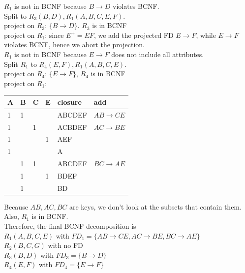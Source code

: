 \documentclass[letter, 9pt]{article}
\begin{document}
\begin{enumerate}
\begin{enumerate}
$R_1$ is not in BCNF because $B\rightarrow D$ violates BCNF. \\
Split to $R_3(B,D), R_1(A,B,C,E,F)$. \\
project on $R_3$: $\{B\rightarrow D\}$. $R_3$ is in BCNF\\
project on $R_1$: since $E^+ = EF$, we add the projected FD $E\rightarrow F$, while $E\rightarrow F$ violates BCNF, hence we abort the projection. \\

$R_1$ is not in BCNF because $E\rightarrow F$ does not include all attributes. \\
Split $R_1$ to $R_{4}(E, F), R_{1}(A, B, C, E)$. \\
project on $R_4$: $\{E\rightarrow F\}$, $R_4$ is in BCNF \\
project on $R_1$: 
\begin{center}
\begin{tabular}{|l|l|l|l|l|l|}
\hline
A & B & C & E & closure & add                \\ \hline
1 & 1 &   &   & ABCDEF  & $AB\rightarrow CE$ \\ \hline
1 &   & 1 &   & ACBDEF  & $AC\rightarrow BE$ \\ \hline
1 &   &   & 1 & AEF     &                    \\ \hline
1 &   &   &   & A       &                    \\ \hline
  & 1 & 1 &   & ABCDEF  & $BC\rightarrow AE$  \\ \hline
  & 1 &   & 1 & BDEF    &                    \\ \hline
  & 1 &   &   & BD      &                    \\ \hline
\end{tabular}
\end{center}
Because $AB,AC,BC$ are keys, we don't look at the subsets that contain them. Also, $R_1$ is in BCNF. \\
Therefore, the final BCNF decomposition is\\
$R_1(A,B,C,E)$ with $FD_1 =\{AB\rightarrow CE, AC\rightarrow BE, BC\rightarrow AE\}$ \\
$R_2(B,C,G)$ with no FD \\
$R_3(B,D)$ with $FD_3=\{B\rightarrow D\}$ \\
$R_4(E,F)$ with $FD_4 = \{E\rightarrow F\}$


\end{enumerate}
\end{enumerate}
\end{document}
